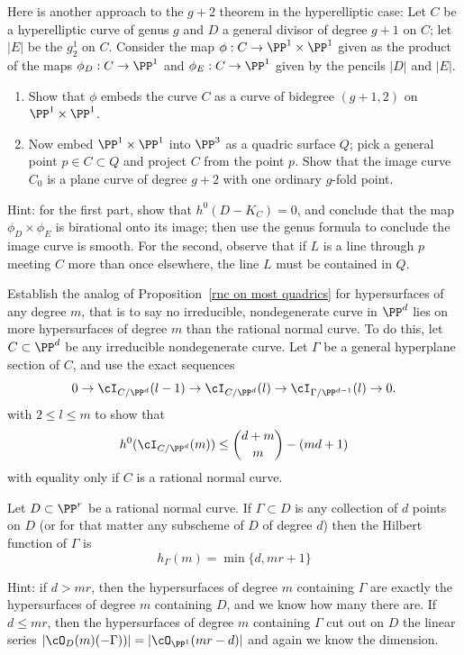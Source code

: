 \begin{exercise}
Here is another approach to the $g+2$ theorem in the hyperelliptic case: 
Let $C$ be a hyperelliptic curve of genus $g$ and $D$ a general divisor of degree $g+1$ on $C$; let $|E|$ be the $g^1_2$ on $C$.
Consider the map $\phi : C \to \PP^1 \times \PP^1$ given as the product of the maps $\phi_D : C \to \PP^1$ and $\phi_E : C \to \PP^1$ given by the pencils $|D|$ and $|E|$.
\begin{enumerate}
\item Show that $\phi$ embeds the curve $C$ as a curve of bidegree $(g+1,2)$ on $\PP^1 \times \PP^1$.
\item Now embed $\PP^1 \times \PP^1$ into $\PP^3$ as a quadric surface $Q$; pick a general point $p \in C \subset Q$ and project $C$ from the point $p$. Show that the image curve $C_0$ is a plane curve of degree $g+2$ with one ordinary $g$-fold point.
\end{enumerate}

Hint: for the first part, show that $h^0(D - K_C) = 0$, and conclude that the map $\phi_D \times \phi_E$ is birational onto its image; then use the genus formula to conclude the image curve is smooth. For the second, observe that if $L$ is a line through $p$ meeting $C$ more than once elsewhere, the line $L$ must be contained in $Q$.
\end{exercise}

\begin{exercise}\label{extremal m-ics}
Establish the analog of Proposition~\ref{rnc on most quadrics} for hypersurfaces of any degree $m$, that is to say no irreducible, nondegenerate curve in $\PP^d$ lies on more hypersurfaces of degree $m$ than the rational normal curve.
To do this, let $C\subset \PP^d$ be any irreducible nondegenerate curve. Let $\Gamma$ be a general hyperplane section
of $C$, and use the exact sequences
$$
0 \to \cI_{C/\PP^d}(l-1) \to \cI_{C/\PP^d}(l) \to \cI_{\Gamma/\PP^{d-1}}(l) \to 0.
$$ 
with $2 \leq l \leq m$ to show that
$$
h^0(\cI_{C/\PP^d}(m)) \leq  \binom{d+m}{m} - (md+1)
$$
with equality only if $C$ is a rational normal curve.
\end{exercise}

\begin{exercise}\label{linear bound is sharp}
Let $D \subset \PP^r$ be a rational normal curve. If $\Gamma \subset D$ is any collection of $d$ points on $D$ (or for that matter any subscheme of $D$ of degree $d$) then the Hilbert function of $\Gamma$ is
$$
h_\Gamma(m) = \min\{d, mr+1\}
$$

Hint: if $d > mr$, then the hypersurfaces of degree $m$ containing $\Gamma$ are exactly the hypersurfaces of degree $m$ containing $D$, and we know how many there are. If $d \leq mr$, then the hypersurfaces of degree $m$ containing $\Gamma$ cut out on $D$ the linear series $|\cO_D(m)(-\Gamma))| = |\cO_{\PP^1}(mr-d)|$ and again we know the dimension.
\end{exercise} 

